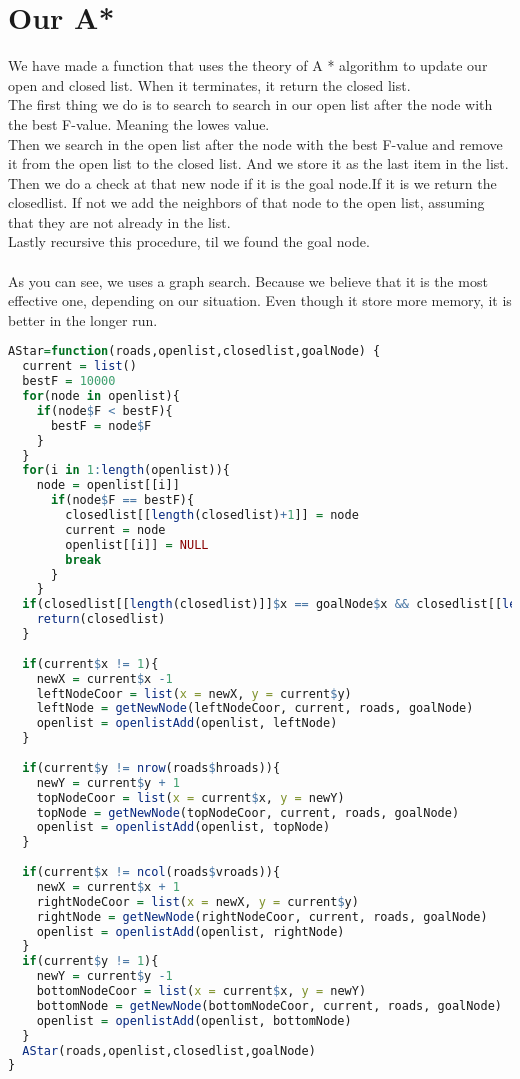 \documentclass[12pt, a4paper]{article}
\begin{document}
\section{Our A*}
We have made a function that uses the theory of A * algorithm to update our open and closed list. When it terminates, it return the closed list.\\
The first thing we do is to search to search in our open list after the node with the best F-value. Meaning the lowes value.\\
Then we search in the open list after the node with the best F-value and remove it from the open list to the closed list. And we store it as the last item in the list.\\
Then we do a check at that new node if it is the goal node.If it is we return the closedlist. If not we add the neighbors of that node to the open list, assuming that they are not already in the list.\\
Lastly recursive this procedure, til we found the goal node.\\\\

As you can see, we uses a graph search. Because we believe that it is the most effective one, depending on our situation. Even though it store more memory, it is better in the longer run.

\begin{lstlisting}[language=R]
AStar=function(roads,openlist,closedlist,goalNode) {
  current = list()
  bestF = 10000
  for(node in openlist){
    if(node$F < bestF){
      bestF = node$F
    } 
  }
  for(i in 1:length(openlist)){
    node = openlist[[i]]
      if(node$F == bestF){
        closedlist[[length(closedlist)+1]] = node
        current = node
        openlist[[i]] = NULL
        break
      } 
    }
  if(closedlist[[length(closedlist)]]$x == goalNode$x && closedlist[[length(closedlist)]]$y == goalNode$y){
    return(closedlist) 
  }
  
  if(current$x != 1){
    newX = current$x -1
    leftNodeCoor = list(x = newX, y = current$y)
    leftNode = getNewNode(leftNodeCoor, current, roads, goalNode)
    openlist = openlistAdd(openlist, leftNode)
  } 
  
  if(current$y != nrow(roads$hroads)){
    newY = current$y + 1
    topNodeCoor = list(x = current$x, y = newY)
    topNode = getNewNode(topNodeCoor, current, roads, goalNode)
    openlist = openlistAdd(openlist, topNode)
  } 
  
  if(current$x != ncol(roads$vroads)){
    newX = current$x + 1
    rightNodeCoor = list(x = newX, y = current$y)
    rightNode = getNewNode(rightNodeCoor, current, roads, goalNode)
    openlist = openlistAdd(openlist, rightNode)
  } 
  if(current$y != 1){
    newY = current$y -1
    bottomNodeCoor = list(x = current$x, y = newY)
    bottomNode = getNewNode(bottomNodeCoor, current, roads, goalNode)
    openlist = openlistAdd(openlist, bottomNode)
  }  
  AStar(roads,openlist,closedlist,goalNode)
}

\end{lstlisting}
\end{document}
